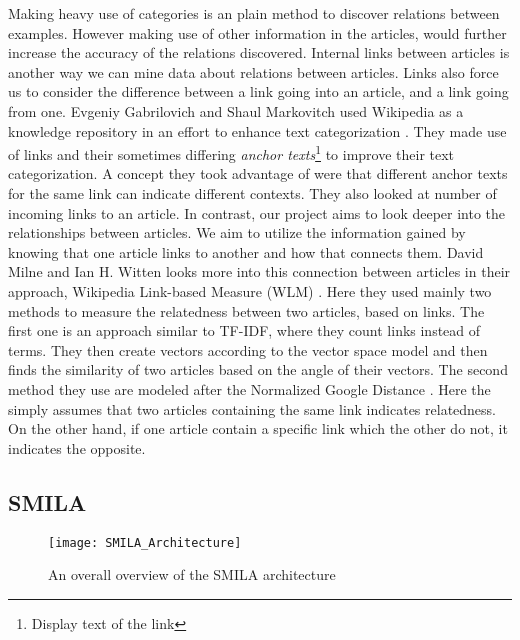 Making heavy use of categories is an plain method to discover relations between examples. However making use of other information in the articles, would further increase the accuracy of the relations discovered. Internal links between articles is another way we can mine data about relations between articles. Links also force us to consider the difference between a link going into an article, and a link going from one. Evgeniy Gabrilovich and Shaul Markovitch used Wikipedia as a knowledge repository in an effort to enhance text categorization  \cite{text-cat}. They made use of links and their sometimes differing \textit{anchor texts}\footnote{Display text of the link} to improve their text categorization. A concept they took advantage of were that different anchor texts for the same link can indicate different contexts.  They also looked at number of incoming links to an article. In contrast, our project aims to look deeper into the relationships between articles. We aim to utilize the information gained by knowing that one article links to another and how that connects them. David Milne and Ian H. Witten looks more into this connection between articles in their approach,  Wikipedia Link-based Measure (WLM) \cite{wlm}. Here they used mainly two methods to measure the relatedness between two articles, based on links. The first one is an approach similar to TF-IDF, where they count links instead of terms. They then create vectors according to the vector space model and then finds the similarity of two articles based on the angle of their vectors. The second method they use are modeled after the Normalized Google Distance  \cite{gsd}. Here the simply assumes that two articles containing the same link indicates relatedness. On the other hand, if one article contain a specific link which the other do not, it indicates the opposite.

\subsection{SMILA} \label{smila}

\begin{figure}[h]
\caption{An overall overview of the SMILA architecture}
\texttt{[image: SMILA\_Architecture]}
\end{figure}



